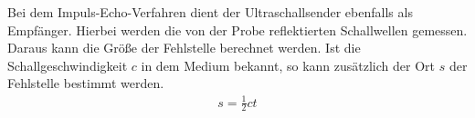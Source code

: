 Bei dem Impuls-Echo-Verfahren dient der Ultraschallsender ebenfalls als Empfänger. Hierbei werden die von der Probe reflektierten
Schallwellen gemessen. Daraus kann die Größe der Fehlstelle berechnet werden. Ist die Schallgeschwindigkeit $c$ in dem Medium bekannt,
so kann zusätzlich der Ort $s$ der Fehlstelle bestimmt werden.
\begin{align}
  s = \frac{1}{2}ct
\end{align}
